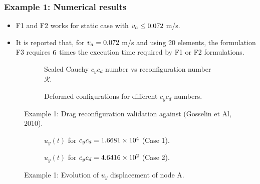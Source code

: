 \documentclass[3p,a4paper,11pt,review]{elsarticle}
\begin{document}
\subsubsection{Example 1: Numerical results}

\begin{itemize}
	\item F1 and F2 works for static case with $v_a \leq 0.072$ m/s. 

	\item It is reported that, for $v_a = 0.072$ m/s and using 20 elements, the formulation F3 requires $6$ times the execution time required by F1 or F2 formulations.
\end{itemize}



\begin{figure}[htb]
	\begin{subfigure}{.5\textwidth}
		\centering
		\resizebox{.93\textwidth}{!}{}
		\caption{Scaled Cauchy $c_yc_d$ number vs reconfiguration number $\mathcal{R}$.}
		\label{fig:ex1CuachyVsR}
	\end{subfigure}
	\begin{subfigure}{0.5\textwidth}
		\centering
		\resizebox{.95\textwidth}{!}{}
		\caption{Deformed configurations for different $c_yc_d$ numbers.}
		\label{fig:ex1DeformedConfig}
	\end{subfigure}
	\caption{Example 1: Drag reconfiguration validation against (Gosselin et Al, 2010).}
	\label{fig:ex1StaticRecValidation}
\end{figure}



\begin{figure}[htb]
	\begin{subfigure}{.5\textwidth}
		\centering
		\resizebox{.93\textwidth}{!}{}
		\caption{$u_y(t)$ for $c_yc_d = 1.6681 \times 10^4$ (Case 1).}
		\label{fig:reconfigurationBeamCase1UyA}
	\end{subfigure}
	\begin{subfigure}{0.5\textwidth}
		\centering
		\resizebox{.95\textwidth}{!}{}
		\caption{$u_y(t)$ for $c_yc_d = 4.6416 \times 10^2$ (Case 2).}
		\label{fig:reconfigurationBeamCase2UyA}
	\end{subfigure}
	\caption{Example 1: Evolution of $u_y$ displacement of node A.}
	\label{fig:reconfigurationCantBeamDynamic}
\end{figure}
\end{document}
